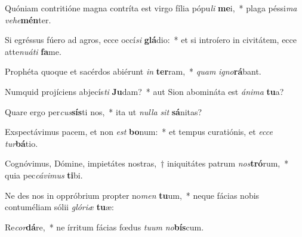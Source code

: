 \item Quóniam contritióne magna contríta est virgo fília pópu\textit{li} \textbf{me}i,~* plaga péssi\textit{ma} \textit{ve}\textit{he}\textbf{mén}ter.
\item Si egréssus fúero ad agros, ecce occí\textit{si} \textbf{glá}dio:~* et si introíero in civitátem, ecce atte\textit{nu}\textit{á}\textit{ti} \textbf{fa}me.
\item Prophéta quoque et sacérdos abiérunt \textit{in} \textbf{ter}ram,~* \textit{quam} \textit{i}\textit{gno}\textbf{rá}bant.
\item Numquid projíciens abjecís\textit{ti} \textbf{Ju}dam?~* aut Sion abomináta est \textit{á}\textit{ni}\textit{ma} \textbf{tu}a?
\item Quare ergo per\textit{cus}\textbf{sís}ti nos,~* ita ut \textit{nul}\textit{la} \textit{sit} \textbf{sá}nitas?
\item Exspectávimus pacem, et non \textit{est} \textbf{bo}num:~* et tempus curatiónis, et \textit{ec}\textit{ce} \textit{tur}\textbf{bá}tio.
\item Cognóvimus, Dómine, impietátes nostras,~† iniquitátes patrum \textit{nos}\textbf{tró}rum,~* quia pec\textit{cá}\textit{vi}\textit{mus} \textbf{ti}bi.
\item Ne des nos in oppróbrium propter no\textit{men} \textbf{tu}um,~* neque fácias nobis contuméliam sólii \textit{gló}\textit{ri}\textit{æ} \textbf{tu}æ:
\item Re\textit{cor}\textbf{dá}re,~* ne írritum fácias fœdus \textit{tu}\textit{um} \textit{no}\textbf{bís}cum.

